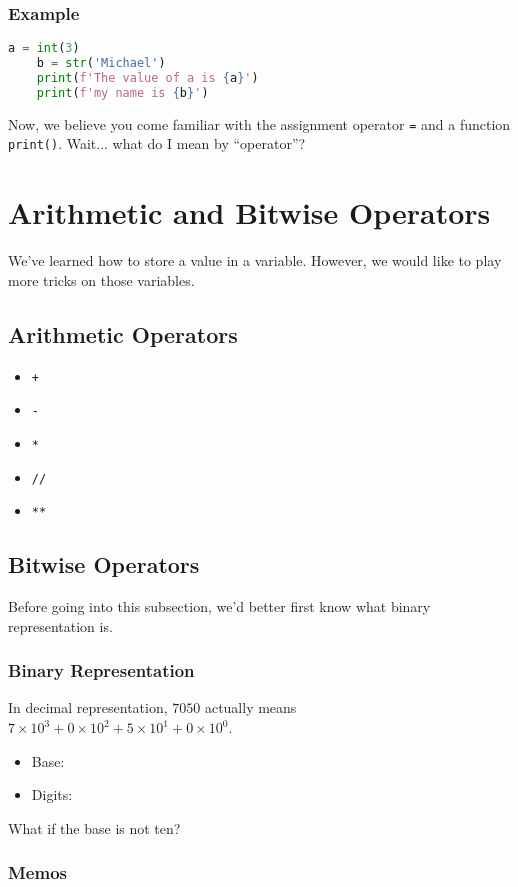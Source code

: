 \documentclass[12pt]{article}
\begin{document}
\begin{CJK*}{UTF8}{bkai}
\subsubsection{Example}
\begin{lstlisting}[language =python]
    a = int(3)
    b = str('Michael')
    print(f'The value of a is {a}')
    print(f'my name is {b}')
\end{lstlisting}

Now, we believe you come familiar with the assignment operator \texttt{=} and a function \texttt{print()}. Wait... what do I mean by ``operator''?
\section{Arithmetic and Bitwise Operators}
We've learned how to store a value in a variable. However, we would like to play more tricks on those variables.
\subsection{Arithmetic Operators}
\begin{itemize}
    \item \texttt{+}
    \item \texttt{-}
    \item \texttt{*}
    \item \texttt{//}
    \item \texttt{**}
\end{itemize}
\subsection{Bitwise Operators}
Before going into this subsection, we'd better first know what binary representation is.
\setcounter{subsubsection}{-1}
\subsubsection*{Binary Representation}
In decimal representation, $7050$ actually means $ 7 \times 10^3 + 0 \times 10^2 + 5 \times 10^1 + 0 \times 10^0$.
\begin{itemize}
    \item Base: \underline{\phantom{xxxxxxxxx}}
    \item Digits: \underline{\phantom{xxxxxxxxx}}
\end{itemize}
What if the base is not ten?
\subsubsection*{Memos}
\vskip 200pt

\end{CJK*}
\end{document}
